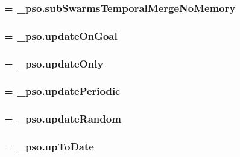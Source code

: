 \hypertarget{namespacepso_08235d686c3fa57b7ff88c31c1daadde}{
\subsubsection{ = \_\-pso.subSwarmsTemporalMergeNoMemory}}
\label{namespacepso_08235d686c3fa57b7ff88c31c1daadde}


\hypertarget{namespacepso_c375f7d831876487d7c2ab48a6ee9350}{
\subsubsection{ = \_\-pso.updateOnGoal}}
\label{namespacepso_c375f7d831876487d7c2ab48a6ee9350}


\hypertarget{namespacepso_018821983caf2879464cd3fe04ee7bc2}{
\subsubsection{ = \_\-pso.updateOnly}}
\label{namespacepso_018821983caf2879464cd3fe04ee7bc2}


\hypertarget{namespacepso_8f17d13a72a14e5dcca6538e168f02ba}{
\subsubsection{ = \_\-pso.updatePeriodic}}
\label{namespacepso_8f17d13a72a14e5dcca6538e168f02ba}


\hypertarget{namespacepso_311496d719ef15ca20374f9c91c7a812}{
\subsubsection{ = \_\-pso.updateRandom}}
\label{namespacepso_311496d719ef15ca20374f9c91c7a812}


\hypertarget{namespacepso_95c63d6d8e2181f3dc0b9598a79e2fb0}{
\subsubsection{ = \_\-pso.upToDate}}
\label{namespacepso_95c63d6d8e2181f3dc0b9598a79e2fb0}


